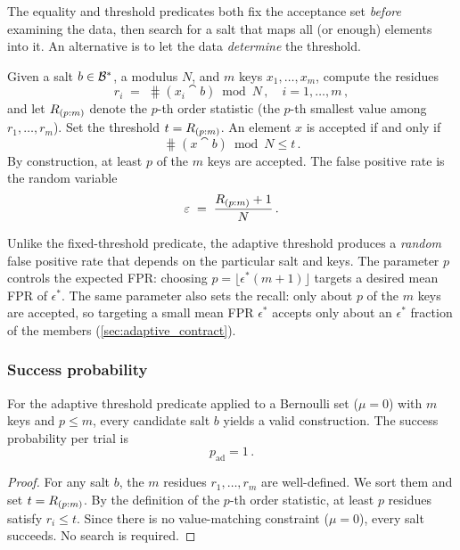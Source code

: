 The equality and threshold predicates both fix the acceptance set \emph{before}
examining the data, then search for a salt that maps all (or enough) elements
into it.
An alternative is to let the data \emph{determine} the threshold.

\begin{definition}
\label{def:adaptive_threshold}
Given a salt $b \in \mathcal{B}^{*}$, a modulus $N$, and $m$ keys
$x_1,\ldots,x_m$, compute the residues
\begin{equation}
    r_i \;=\; \hash(x_i \cat b) \bmod N\,, \quad i = 1,\ldots,m\,,
\end{equation}
and let $R_{(p:m)}$ denote the $p$-th order statistic (the $p$-th smallest
value among $r_1,\ldots,r_m$).
Set the threshold $t = R_{(p:m)}$.
An element $x$ is accepted if and only if
\begin{equation}
\label{eq:adaptive_test}
    \hash(x \cat b) \bmod N \leq t\,.
\end{equation}
By construction, at least $p$ of the $m$ keys are accepted.
The false positive rate is the random variable
\begin{equation}
\label{eq:adaptive_fpr}
    \varepsilon \;=\; \frac{R_{(p:m)} + 1}{N}\,.
\end{equation}
\end{definition}

\begin{remark}
Unlike the fixed-threshold predicate, the adaptive threshold produces a
\emph{random} false positive rate that depends on the particular salt and keys.
The parameter $p$ controls the expected FPR: choosing
$p = \lfloor \epsilon^{*}(m+1) \rfloor$ targets a desired mean FPR of
$\epsilon^{*}$.
The same parameter also sets the recall: only about $p$ of the $m$ keys are
accepted, so targeting a small mean FPR $\epsilon^{*}$ accepts only about an
$\epsilon^{*}$ fraction of the members (\cref{sec:adaptive_contract}).
\end{remark}

\subsubsection{Success probability}

\begin{theorem}
\label{thm:success_adaptive_set}
For the adaptive threshold predicate applied to a Bernoulli set ($\mu = 0$)
with $m$ keys and $p \leq m$, every candidate salt $b$ yields a valid
construction.
The success probability per trial is
\begin{equation}
    p_{\mathrm{ad}} = 1\,.
\end{equation}
\end{theorem}
\begin{proof}
For any salt $b$, the $m$ residues $r_1,\ldots,r_m$ are well-defined.
We sort them and set $t = R_{(p:m)}$.
By the definition of the $p$-th order statistic, at least $p$ residues
satisfy $r_i \leq t$.
Since there is no value-matching constraint ($\mu = 0$), every salt succeeds.
No search is required.
\end{proof}

